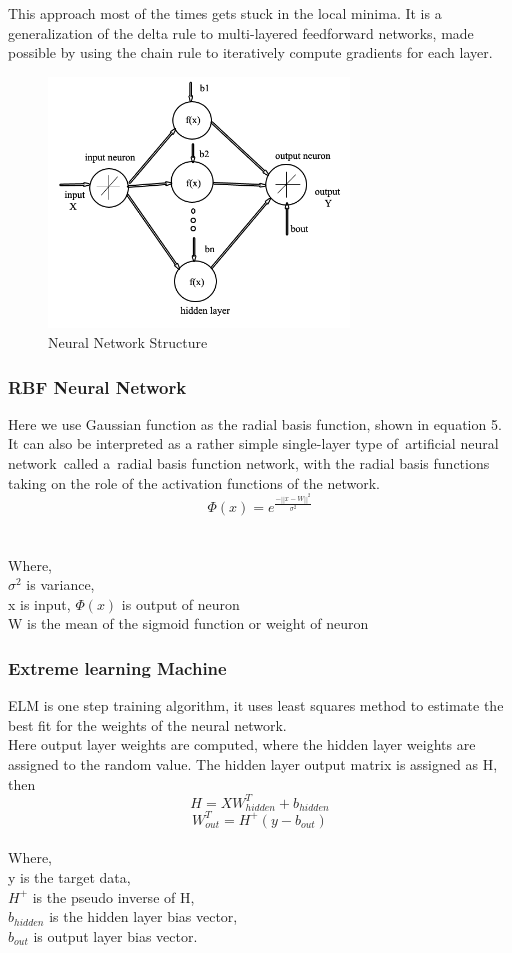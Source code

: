 \documentclass[conference]{IEEEtran}
\begin{document}
This approach most of the times gets stuck in the local minima.  It is a generalization of the delta rule to multi-layered feedforward networks, made possible by using the chain rule to iteratively compute gradients for each layer.
\begin{figure}[h]
\includegraphics[width=8cm]{net.png}
\centering
\caption{Neural Network Structure}\label{net_img}
\end{figure}
\subsubsection{RBF Neural Network}
Here we use Gaussian function as the radial basis function, shown in equation 5. It can also be interpreted as a rather simple single-layer type of artificial neural network called a radial basis function network, with the radial basis functions taking on the role of the activation functions of the network. 
\begin{equation} \label{eq:3}
\Phi(x) =   {e} ^ {\frac{- {||x-W||} ^ {2}}{{\sigma} ^ {2}}}
\end{equation}\\
\\Where,\\
$\sigma^2$ is variance,\\
x is input, $\Phi(x)$ is output of neuron\\
W is the mean of the sigmoid function or weight of neuron\\
\subsubsection{Extreme learning Machine}
ELM is one step training algorithm, it uses least squares method to estimate the best fit for the weights of the neural network. \\
Here output layer weights are computed, where the hidden layer weights are assigned to the random value. The hidden layer output matrix is assigned as H, then 
\begin{equation} \label{eq:3}
H=XW_{hidden}^T+b_{hidden}
\end{equation}
\begin{equation} \label{eq:4}
W_{out}^T=H^+(y-b_{out})
\end{equation}
\\Where,\\
y is the target data,\\
$H^+$ is the pseudo inverse of H,\\
$b_{hidden}$ is the hidden layer bias vector,\\
$b_{out}$ is output layer bias vector.\\
\end{document}
